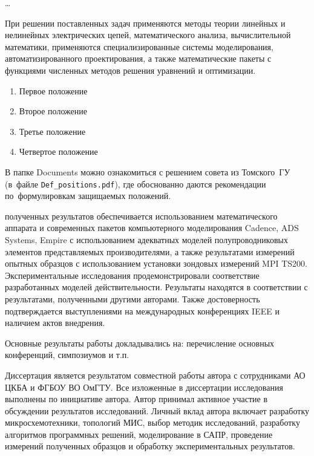 {\influence} \ldots

{\methods}
При решении поставленных задач применяются методы теории линейных и нелинейных электрических цепей, математического анализа, вычислительной математики, применяются специализированные системы моделирования, автоматизированного проектирования, а также математические пакеты с функциями численных методов решения уравнений и оптимизации.

{}
\begin{enumerate}[beginpenalty=10000] %
  \item Первое положение
  \item Второе положение
  \item Третье положение
  \item Четвертое положение
\end{enumerate}
В папке Documents можно ознакомиться с решением совета из Томского~ГУ
(в~файле \verb+Def_positions.pdf+), где обоснованно даются рекомендации
по~формулировкам защищаемых положений.

{\reliability} полученных результатов обеспечивается использованием математического аппарата и современных пакетов компьютерного моделирования Cadence, ADS Systems, Empire с использованием адекватных моделей полупроводниковых элементов представляемых производителями, а также результатами измерений опытных образцов с использованием установки зондовых измерений MPI TS200. Экспериментальные исследования продемонстрировали соответствие разработанных моделей действительности. Результаты находятся в соответствии с результатами, полученными другими авторами. Также достоверность подтверждается выступлениями на международных конференциях IEEE и наличием актов внедрения.

{\probation}
Основные результаты работы докладывались на:
перечисление основных конференций, симпозиумов и т.\:п.

{\contribution} Диссертация является результатом совместной работы автора с сотрудниками АО ЦКБА и ФГБОУ ВО ОмГТУ. Все изложенные в диссертации исследования выполнены по инициативе автора. Автор принимал активное участие в обсуждении результатов исследований. Личный вклад автора включает разработку микросхемотехники, топологий МИС, выбор методик исследований, разработку алгоритмов программных решений, моделирование в САПР, проведение измерений полученных образцов и обработку экспериментальных результатов.

